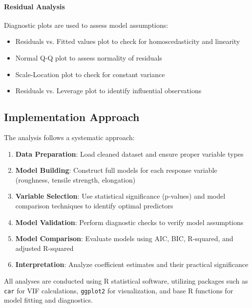 \paragraph{Residual Analysis}

Diagnostic plots are used to assess model assumptions:
\begin{itemize}
    \item Residuals vs. Fitted values plot to check for homoscedasticity and linearity
    \item Normal Q-Q plot to assess normality of residuals
    \item Scale-Location plot to check for constant variance
    \item Residuals vs. Leverage plot to identify influential observations
\end{itemize}

\subsection{Implementation Approach}

The analysis follows a systematic approach:

\begin{enumerate}
    \item \textbf{Data Preparation}: Load cleaned dataset and ensure proper variable types
    \item \textbf{Model Building}: Construct full models for each response variable (roughness, tensile strength, elongation)
    \item \textbf{Variable Selection}: Use statistical significance (p-values) and model comparison techniques to identify optimal predictors
    \item \textbf{Model Validation}: Perform diagnostic checks to verify model assumptions
    \item \textbf{Model Comparison}: Evaluate models using AIC, BIC, R-squared, and adjusted R-squared
    \item \textbf{Interpretation}: Analyze coefficient estimates and their practical significance
\end{enumerate}

All analyses are conducted using R statistical software, utilizing packages such as \texttt{car} for VIF calculations, \texttt{ggplot2} for visualization, and base R functions for model fitting and diagnostics.